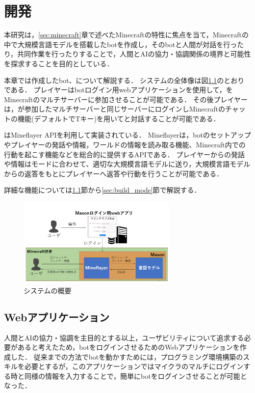 \chapter{開発} 
\thispagestyle{plain}   %

本研究は，\ref{sec:minecraft}章で述べたMinecraftの特性に焦点を当て，Minecraftの中で大規模言語モデルを搭載したbotを作成し，そのbotと人間が対話を行ったり，共同作業を行ったりすることで，人間とAIの協力・協調関係の境界と可能性を探求することを目的としている．

本章では作成したbot、{\mason}について解説する．
システムの全体像は図\ref{fig:system}のとおりである．
プレイヤーはbotログイン用webアプリケーションを使用して，{\mason}をMinecraftのマルチサーバーに参加させることが可能である．
その後プレイヤーは，{\mason}が参加したマルチサーバーと同じサーバーにログインしMinecraftのチャットの機能(デフォルトでTキー)を用いて{\mason}と対話することが可能である．

{\mason}はMineflayer API\cite{bib:Mineflayer}を利用して実装されている．
Mineflayerは，botのセットアップやプレイヤーの発話や情報，ワールドの情報を読み取る機能、Minecraft内での行動を起こす機能などを総合的に提供するAPIである．
プレイヤーからの発話や情報はモードに合わせて、適切な大規模言語モデルに送り，大規模言語モデルからの返答をもとにプレイヤーへ返答や行動を行うことが可能である．

詳細な機能については\ref{sec:webapp}節から\ref{sec:build_mode}節で解説する．

\begin{figure}[H]
    \centering
    \includegraphics[width=0.7\textwidth]{fig/my_system.PNG}
    \caption{システムの概要}
    \label{fig:system}
\end{figure}

\section{Webアプリケーション}\label{sec:webapp}
人間とAIの協力・協調を主目的とする以上，ユーザビリティについて追求する必要があると考えたため，botをログインさせるためのWebアプリケーションを作成した．
従来までの方法でbotを動かすためには，プログラミング環境構築のスキルを必要とするが，このアプリケーションではマイクラのマルチにログインする時と同様の情報を入力することで，簡単にbotをログインさせることが可能となった．

